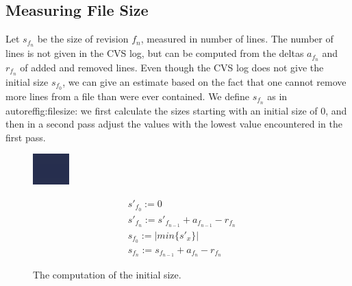\documentclass[10pt]{book}
\begin{document}
\subsection{Measuring File Size}

Let $s_{f_n}$ be the size of revision $f_n$, measured in number of lines. The number of lines is not given in the CVS log, but can be computed from the deltas $a_{f_n}$ and $r_{f_n}$ of added and removed lines. Even though the CVS log does not give the initial size $s_{f_0}$, we can give an estimate based on the fact that one cannot remove more lines from a file than were ever contained. We define $s_{f_n}$ as in autoref{fig:filesize}: we first calculate the sizes starting with an initial size of 0, and then in a second pass adjust the values with the lowest value encountered in the first pass.

\begin{figure}[htbp]
\begin{minipage}[c]{.45\linewidth}
\includegraphics[width=1.2\linewidth]{minimum}
 \end{minipage}
 \hfill
 \begin{minipage}[c]{.5\linewidth}
\begin{eqnarray}
& s'_{f_0} := 0 \nonumber \\
& s'_{f_n} := s'_{f_{n-1}} + a_{f_{n-1}} - r_{f_n} \nonumber  \\
& s_{f_0} := \vert min \{ s'_x \} \vert \nonumber \\
& s_{f_n} := s_{f_{n-1}} + a_{f_n} - r_{f_n} \nonumber
 \end{eqnarray}
 \end{minipage}
\caption{The computation of the initial size.}
\label{fig:filesize}
\end{figure}
\end{document}
